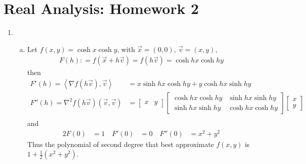 \documentclass[a4paper,12pt]{article}
\theoremstyle{definition}
\begin{document}
\section*{Real Analysis: Homework 2}

\begin{enumerate}

\item 
\begin{enumerate}[(a)]
\item Let $f(x,y) = \cosh x \cosh y$, with $\vec{x} = (0,0)$, $\vec{v}=(x,y)$,
\begin{align*}
F(h): = f(\vec{x}+h\vec{v}) = f(h\vec{v}) = \cosh hx\cosh hy
\end{align*}
then
\begin{align*}
F'(h)=\left\langle\nabla f(h\vec{v}),\vec{v}\right\rangle  &= x \sinh hx \cosh hy + y \cosh hx \sinh hy\\
F''(h)=\nabla^2 f(h\vec{v})(\vec{v},\vec{v})&=\begin{bmatrix}x & y\end{bmatrix}\begin{bmatrix}\cosh hx \cosh hy & \sinh hx \sinh hy \\ \sinh hx \sinh hy &\cosh hx \cosh hy \end{bmatrix}\begin{bmatrix}x \\ y\end{bmatrix}\\
\end{align*}
and 
\begin{alignat*}{2}
F(0) &= 1 \quad F'(0) &= 0 \quad  F''(0) &= x^2 + y^2 %
\end{alignat*}
Thus the polynomial of second degree that best approximate $f(x,y)$ is $1+\frac{1}{2}(x^2+y^2)$.


\end{enumerate}
\end{enumerate}
\end{document}
